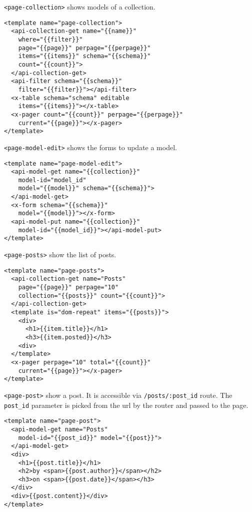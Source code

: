 \texttt{<page-collection>} shows models of a collection.

\begin{lstlisting}[language=HTML5]
<template name="page-collection">
  <api-collection-get name="{{name}}" 
    where="{{filter}}" 
    page="{{page}}" perpage="{{perpage}}"  
    items="{{items}}" schema="{{schema}}"
    count="{{count}}">
  </api-collection-get>
  <api-filter schema="{{schema}}"
    filter="{{filter}}"></api-filter>
  <x-table schema="schema" editable
    items="{{items}}"></x-table>
  <x-pager count="{{count}}" perpage="{{perpage}}"
    current="{{page}}"></x-pager>
</template>
\end{lstlisting}

\vspace{0.2cm}

\texttt{<page-model-edit>} shows the forms to update a model.

\begin{lstlisting}[language=HTML5]
<template name="page-model-edit">
  <api-model-get name="{{collection}}"
    model-id="model_id"
    model="{{model}}" schema="{{schema}}">
  </api-model-get>
  <x-form schema="{{schema}}" 
    model="{{model}}"></x-form>
  <api-model-put name="{{collection}}"
    model-id="{{model_id}}"></api-model-put>
</template>
\end{lstlisting}

\vspace{0.2cm}

\texttt{<page-posts>} show the list of posts.

\begin{lstlisting}[language=HTML5]
<template name="page-posts">
  <api-collection-get name="Posts"
    page="{{page}}" perpage="10"
    collection="{{posts}}" count="{{count}}">
  </api-collection-get>
  <template is="dom-repeat" items="{{posts}}">
    <div>
      <h1>{{item.title}}</h1>
      <h3>{{item.posted}}</h3>
    <div>
  </template>
  <x-pager perpage="10" total="{{count}}" 
    current="{{page}}"></x-pager>
</template>
\end{lstlisting}

\texttt{<page-post>} show a post. 
It is accessible via \texttt{/posts/:post\_id} route.
The \texttt{post\_id} parameter is picked from the url by the router and passed to the page.

\begin{lstlisting}[language=HTML5]
<template name="page-post">
  <api-model-get name="Posts" 
    model-id="{{post_id}}" model="{{post}}">
  </api-model-get>
  <div>
    <h1>{{post.title}}</h1>
    <h2>by <span>{{post.author}}</span></h2>
    <h3>on <span>{{post.date}}</span></h3>
  </div>
  <div>{{post.content}}</div>
</template>
\end{lstlisting}

